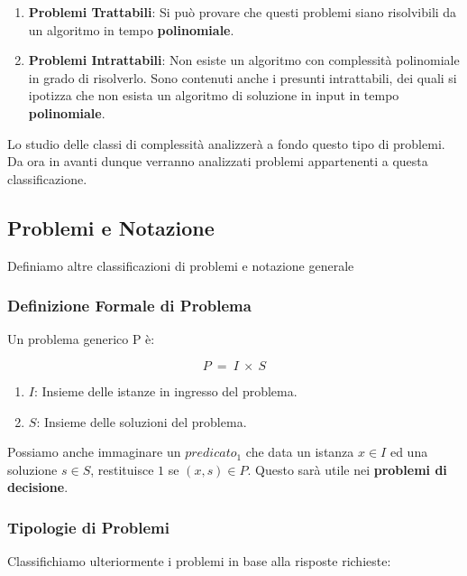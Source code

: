 \documentclass{article}
\begin{document}
\begin{enumerate}
    \item \textbf{Problemi Trattabili}: Si può provare che questi problemi siano risolvibili da un algoritmo in tempo \textbf{polinomiale}.
    \item \textbf{Problemi Intrattabili}: Non esiste un algoritmo con complessità polinomiale in grado di risolverlo.
    Sono contenuti anche i presunti intrattabili, dei quali si ipotizza che non esista un algoritmo di soluzione in input in tempo \textbf{polinomiale}.
\end{enumerate}

Lo studio delle classi di complessità analizzerà a fondo questo tipo di problemi. Da ora in avanti dunque verranno analizzati problemi appartenenti a questa classificazione.

\subsection{Problemi e Notazione}

Definiamo altre classificazioni di problemi e notazione generale

\subsubsection{Definizione Formale di Problema} Un problema generico P è:

\begin{equation}
    P \: = \: I \: \times \: S
\end{equation}

\begin{enumerate}
    \item $I$: Insieme delle istanze in ingresso del problema.
    \item $S$: Insieme delle soluzioni del problema.
\end{enumerate}

Possiamo anche immaginare un $predicato_{1}$ che data un istanza $x \in I$ ed una soluzione $s \in S$, restituisce $1$ se $(x,s) \in P$. Questo sarà utile nei \textbf{problemi di decisione}.

\subsubsection{Tipologie di Problemi}

Classifichiamo ulteriormente i problemi in base alla risposte richieste:
\end{document}

